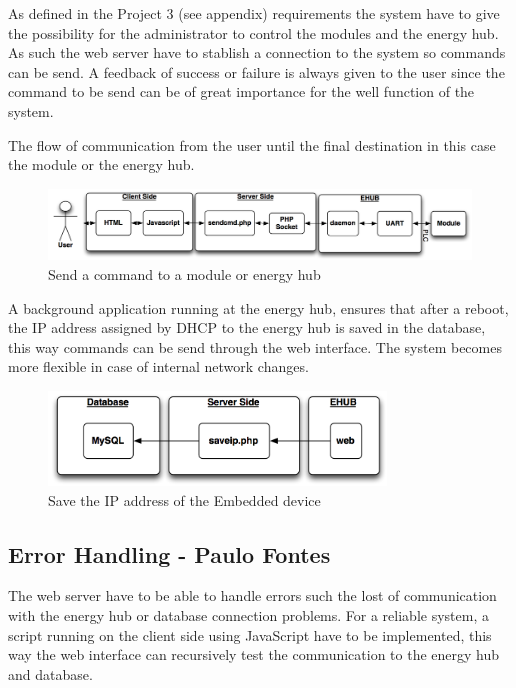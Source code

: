 As defined in the Project 3 (see appendix) requirements the system have to give the possibility for the administrator to control the modules and the energy hub. As such the web server have to stablish a connection to the system so commands can be send. A feedback of success or failure is always given to the user since the command to be send can be of great importance for the well function of the system.

The flow of communication from the user until the final destination in this case the module or the energy hub.
\begin{figure}[H]
	\begin{centering}
		\includegraphics[width=1\textwidth]{images/sendcmd.png}
		\caption{Send a command to a module or energy hub}
	\end{centering}
\end{figure}

A background application running at the energy hub, ensures that after a reboot, the IP address assigned by DHCP to the energy hub is saved in the database, this way commands can be send through the web interface. The system becomes more flexible in case of internal network changes.
\begin{figure}[H]
	\begin{centering}
		\includegraphics[width=0.8\textwidth]{images/saveip.png}
		\caption{Save the IP address of the Embedded device}
	\end{centering}
\end{figure}

\subsection{Error Handling - Paulo Fontes}
The web server have to be able to handle errors such the lost of communication with the energy hub or database connection problems. For a reliable system, a script running on the client side using JavaScript have to be implemented, this way the web interface can recursively test the communication to the energy hub and database.

